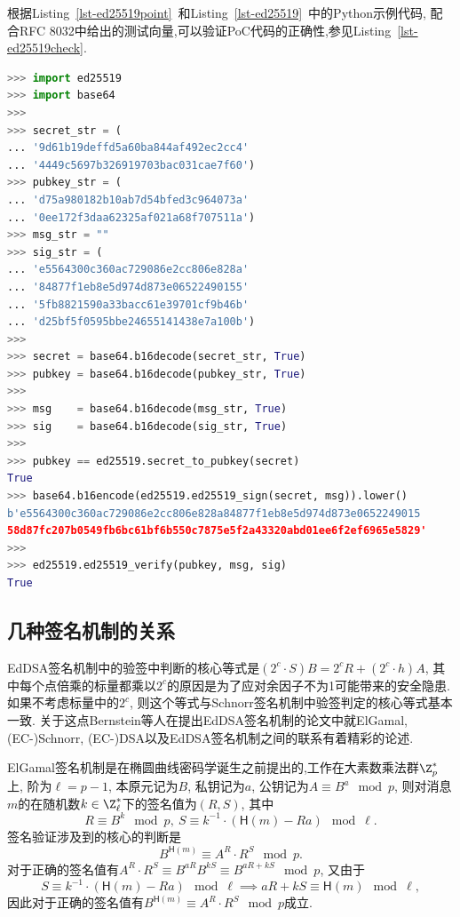 

根据Listing~\ref{lst-ed25519point}~和Listing~\ref{lst-ed25519}~中的Python示例代码,
配合RFC 8032中给出的测试向量,可以验证PoC代码的正确性,参见Listing~\ref{lst-ed25519check}.

\begin{lstlisting}[language=python, caption=验证Ed25519实现正确性, label=lst-ed25519check]
>>> import ed25519
>>> import base64
>>>
>>> secret_str = (
... '9d61b19deffd5a60ba844af492ec2cc4'
... '4449c5697b326919703bac031cae7f60')
>>> pubkey_str = (
... 'd75a980182b10ab7d54bfed3c964073a'
... '0ee172f3daa62325af021a68f707511a')
>>> msg_str = ""
>>> sig_str = (
... 'e5564300c360ac729086e2cc806e828a'
... '84877f1eb8e5d974d873e06522490155'
... '5fb8821590a33bacc61e39701cf9b46b'
... 'd25bf5f0595bbe24655141438e7a100b')
>>>
>>> secret = base64.b16decode(secret_str, True)
>>> pubkey = base64.b16decode(pubkey_str, True)
>>>
>>> msg    = base64.b16decode(msg_str, True)
>>> sig    = base64.b16decode(sig_str, True)
>>> 
>>> pubkey == ed25519.secret_to_pubkey(secret)
True
>>> base64.b16encode(ed25519.ed25519_sign(secret, msg)).lower()
b'e5564300c360ac729086e2cc806e828a84877f1eb8e5d974d873e0652249015
58d87fc207b0549fb6bc61bf6b550c7875e5f2a43320abd01ee6f2ef6965e5829'
>>>
>>> ed25519.ed25519_verify(pubkey, msg, sig)
True
\end{lstlisting}

\subsection{几种签名机制的关系}

EdDSA签名机制中的验签中判断的核心等式是$(2^c\cdot S)B = 2^c R + (2^c\cdot h)A$,
其中每个点倍乘的标量都乘以$2^c$的原因是为了应对余因子不为1可能带来的安全隐患.
如果不考虑标量中的$2^c$, 则这个等式与Schnorr签名机制中验签判定的核心等式基本一致.
关于这点Bernstein等人在提出EdDSA签名机制的论文中就ElGamal,  (EC-)Schnorr, 
(EC-)DSA以及EdDSA签名机制之间的联系有着精彩的论述.

ElGamal签名机制是在椭圆曲线密码学诞生之前提出的,工作在大素数乘法群$\Z^*_p$上,
阶为$\ell = p-1$, 本原元记为$B$, 私钥记为$a$, 公钥记为$A \equiv B^a \mod p$, 
则对消息$m$的在随机数$k \in\Z^*_{\ell}$下的签名值为$(R, S)$, 其中
$$R \equiv B^k \mod p, \ S \equiv k^{-1} \cdot (\textsf{H}(m) - Ra) \mod \ell.$$
签名验证涉及到的核心的判断是
$$B^{\textsf{H}(m)} \equiv A^R \cdot R^S \mod p.$$
对于正确的签名值有$A^R \cdot R^S \equiv B^{aR} B^{kS} \equiv B^{aR + kS} \mod p$,
又由于
$$S \equiv k^{-1} \cdot (\textsf{H}(m) - Ra) \mod \ell \implies aR + kS \equiv \textsf{H}(m) \mod \ell,$$
因此对于正确的签名值有$B^{\textsf{H}(m)} \equiv A^R \cdot R^S \mod p$成立.

